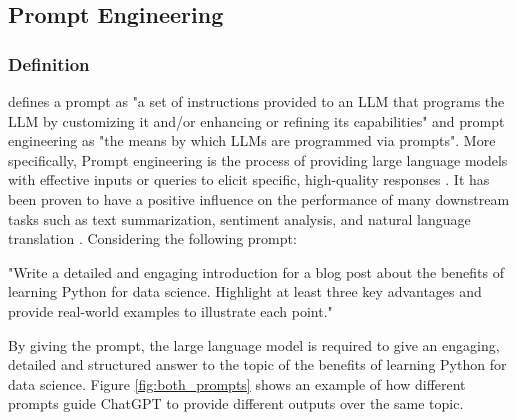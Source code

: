 \documentclass[runningheads]{llncs}
\begin{document}
\subsection{Prompt Engineering}
\subsubsection{Definition}
\noindent \newline
\cite{LiuPengfei23} defines a prompt as "a set of instructions provided to an LLM that programs the LLM by customizing it and/or enhancing or refining its capabilities" and prompt engineering
as "the means by which LLMs are programmed via prompts". More specifically, Prompt engineering is the process of providing large language models with effective inputs or queries to elicit specific, high-quality responses \cite{Zhang24}.
It has been proven to have a positive influence on the performance of many downstream tasks such as text summarization, sentiment analysis,
and natural language translation \cite{Liu21}. Considering the following prompt:
\begin{example}
  "Write a detailed and engaging introduction for a blog post about the benefits of learning Python for data science. Highlight at least three key advantages and provide real-world examples to illustrate each point."
\end{example}
By giving the prompt, the large language model is required to give an engaging, detailed and structured answer to the topic of the benefits of learning Python for data science.
Figure \ref{fig:both_prompts} shows an example of how different prompts guide ChatGPT to provide different outputs over the same topic.
\end{document}

